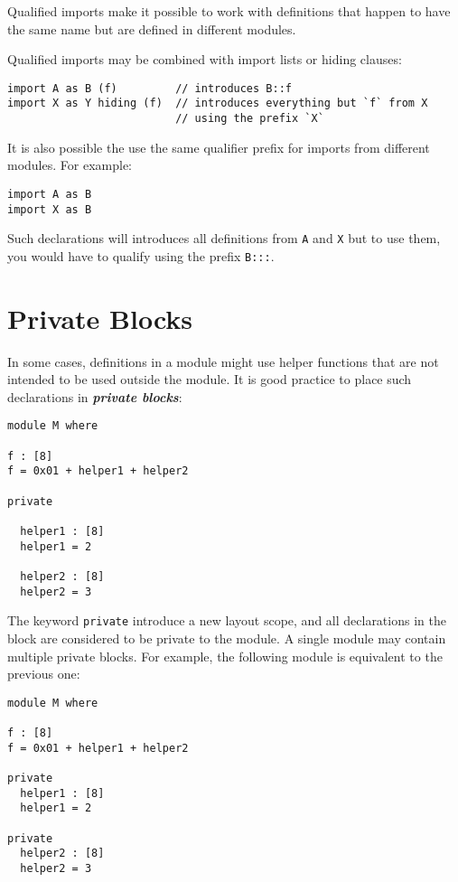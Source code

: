 Qualified imports make it possible to work with definitions that happen
to have the same name but are defined in different modules.

Qualified imports may be combined with import lists or hiding clauses:

\begin{verbatim}
import A as B (f)         // introduces B::f
import X as Y hiding (f)  // introduces everything but `f` from X
                          // using the prefix `X`
\end{verbatim}

It is also possible the use the same qualifier prefix for imports from
different modules. For example:

\begin{verbatim}
import A as B
import X as B
\end{verbatim}

Such declarations will introduces all definitions from \texttt{A} and
\texttt{X} but to use them, you would have to qualify using the prefix
\texttt{B:::}.

\hypertarget{private-blocks}{%
\section{Private Blocks}\label{private-blocks}}

In some cases, definitions in a module might use helper functions that
are not intended to be used outside the module. It is good practice to
place such declarations in \textbf{\emph{private blocks}}:

\begin{verbatim}
module M where

f : [8]
f = 0x01 + helper1 + helper2

private

  helper1 : [8]
  helper1 = 2

  helper2 : [8]
  helper2 = 3
\end{verbatim}

The keyword \texttt{private} introduce a new layout scope, and all
declarations in the block are considered to be private to the module. A
single module may contain multiple private blocks. For example, the
following module is equivalent to the previous one:

\begin{verbatim}
module M where

f : [8]
f = 0x01 + helper1 + helper2

private
  helper1 : [8]
  helper1 = 2

private
  helper2 : [8]
  helper2 = 3
\end{verbatim}

